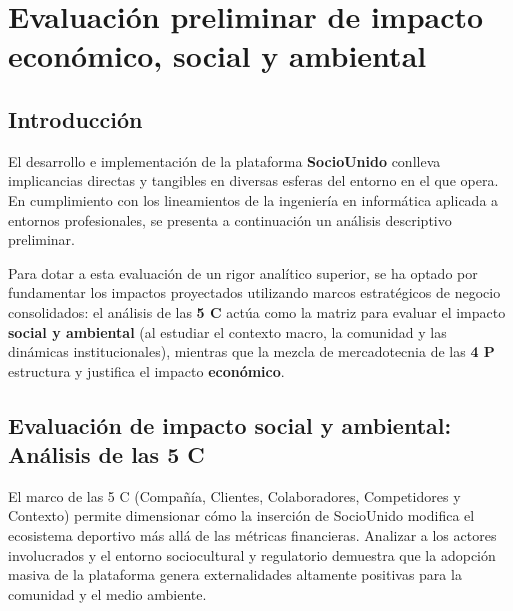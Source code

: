 \section{Evaluación preliminar de impacto económico, social y ambiental}

\subsection{Introducción}

El desarrollo e implementación de la plataforma \textbf{SocioUnido} conlleva implicancias directas y tangibles en diversas esferas del entorno en el que opera. En cumplimiento con los lineamientos de la ingeniería en informática aplicada a entornos profesionales, se presenta a continuación un análisis descriptivo preliminar. 

Para dotar a esta evaluación de un rigor analítico superior, se ha optado por fundamentar los impactos proyectados utilizando marcos estratégicos de negocio consolidados: el análisis de las \textbf{5 C} actúa como la matriz para evaluar el impacto \textbf{social y ambiental} (al estudiar el contexto macro, la comunidad y las dinámicas institucionales), mientras que la mezcla de mercadotecnia de las \textbf{4 P} estructura y justifica el impacto \textbf{económico}.

\subsection{Evaluación de impacto social y ambiental: Análisis de las 5 C}

El marco de las 5 C (Compañía, Clientes, Colaboradores, Competidores y Contexto) permite dimensionar cómo la inserción de SocioUnido modifica el ecosistema deportivo más allá de las métricas financieras. Analizar a los actores involucrados y el entorno sociocultural y regulatorio demuestra que la adopción masiva de la plataforma genera externalidades altamente positivas para la comunidad y el medio ambiente.

